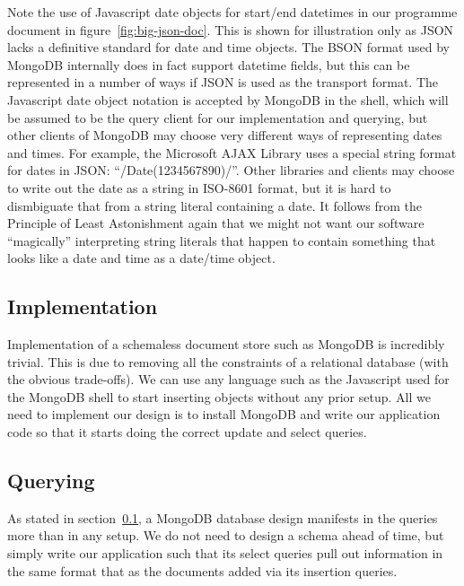 \documentclass[11pt,a4paper]{article}
\begin{document}
Note the use of Javascript date objects for start/end datetimes in our
programme document in figure~\ref{fig:big-json-doc}. This is
shown for illustration only as JSON lacks a definitive standard for date
and time objects. The BSON format used by MongoDB internally does
in fact support datetime fields, but this can be represented in a
number of ways if JSON is used as the transport format. The Javascript
date object notation is accepted by MongoDB in the shell, which
will be assumed to be the query client for our implementation and
querying, but other clients of MongoDB may choose very different
ways of representing dates and times. For example, the
Microsoft AJAX Library uses a special string format for dates in JSON:
``/Date(1234567890)/''. \cite{ms-ajax-json-dates} Other libraries
and clients may choose to write out the date as a string in ISO-8601 format,
but it is hard to dismbiguate that from a string literal containing
a date. It follows from the Principle of Least Astonishment
\cite{saltzer2009principles} again
that we might not want our software ``magically'' interpreting
string literals that happen to contain something that looks like a date
and time as a date/time object.

\subsection{Implementation}
\label{sec:mongo-implementation}

Implementation of a schemaless document store such as MongoDB is
incredibly trivial. This is due to removing all the constraints
of a relational database (with the obvious trade-offs). We can use
any language such as the Javascript used for the MongoDB shell to
start inserting objects without any prior setup. All we need to implement
our design is to install MongoDB and write our application code so that
it starts doing the correct update and select queries.

\subsection{Querying}
\label{sec:mongo-querying}

As stated in section~\ref{sec:mongo-implementation}, a MongoDB database
design manifests in the queries more than in any setup. We do not need
to design a schema ahead of time, but simply write our application such
that its select queries pull out information in the same format that
as the documents added via its insertion queries.
\end{document}
